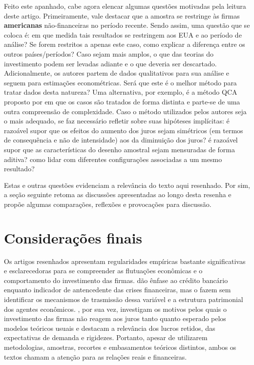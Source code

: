 \documentclass[11pt]{article}
\begin{document}
Feito este apanhado, cabe agora elencar algumas questões motivadas pela leitura deste artigo.
Primeiramente, vale destacar que a amostra se restringe às firmas \textbf{americanas} não-financeiras no período recente.
Sendo assim, uma questão que se coloca é: em que medida tais resultados se restringem aos EUA e ao período de análise? Se forem restritos a apenas este caso, como explicar a diferença entre os outros países/períodos? Caso sejam mais amplos, o que das teorias do investimento podem ser levadas adiante e o que deveria ser descartado.
Adicionalmente, os autores partem de dados qualitativos para sua análise e seguem para estimações econométricas.
Será que este é o melhor método para tratar dados desta natureza? Uma alternativa, por exemplo, é a método QCA proposto por \textcite{raginComparativeMethodMoving1987} em que os casos são tratados de forma distinta e parte-se de uma outra compreensão de complexidade.
Caso o método utilizados pelos autores seja o mais adequado, se faz necessário refletir sobre suas hipóteses implícitas: é razoável supor que os efeitos do aumento dos juros sejam simétricos (em termos de consequência e não de intensidade) aos da diminuição dos juros? é razoável supor que as características do desenho amostral sejam mensuradas de forma aditiva? como lidar com diferentes configurações associadas a um mesmo resultado?

Estas e outras questões evidenciam a relevância do texto aqui resenhado.
Por sim, a seção seguinte retoma as discussões apresentadas ao longo desta resenha e propõe algumas comparações, reflexões e provocações para discussão.


\section*{Considerações finais}
\label{sec:org8504fb6}

Os artigos resenhados apresentam regularidades empíricas bastante significativas e esclarecedoras para se compreender as flutuações econômicas e o comportamento do investimento das firmas.
\textcite{schularickCreditBoomsGone2012} dão ênfase ao crédito bancário enquanto indicador de antencedente das crises financeiras, mas o fazem sem identificar os mecanismos de trasmissão dessa variável e a estrutura patrimonial dos agentes econômicos.
\textcite{sharpe_2020_Why}, por sua vez, investigam os motivos pelos quais o investimento das firmas não reagem aos juros tanto quanto esperado pelos modelos teóricos usuais e destacam a relevância dos lucros retidos, das expectativas de demanda e rigidezes.
Portanto, apesar de utilizarem metodologias, amostras, recortes e embasamentos teóricos distintos, ambos os textos chamam a atenção para as relações reais e financeiras.
\end{document}
